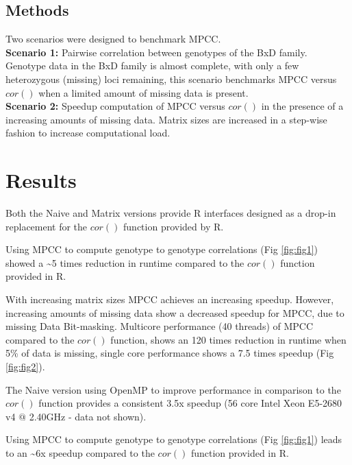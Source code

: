 \documentclass{bioinfo}
\begin{document}
\vspace*{-5mm}

\begin{methods}

\section{Methods}
Two scenarios were designed to benchmark MPCC.\\ {\bf Scenario 1:}
Pairwise correlation between genotypes of the BxD family.  Genotype
data in the BxD family is almost complete, with only a few
heterozygous (missing) loci remaining, this scenario benchmarks MPCC
versus $cor()$ when a limited amount of missing data is present.\\
{\bf Scenario 2:} Speedup computation of MPCC versus $cor()$ in the
presence of a increasing amounts of missing data. Matrix sizes are
increased in a step-wise fashion to increase computational load.
\end{methods}

\vspace*{-2mm}

\section{Results}

Both the Naive and Matrix versions provide R interfaces designed as a
drop-in replacement for the $cor()$ function provided by R.

Using MPCC to compute genotype to genotype correlations
(Fig \ref{fig:fig1}) showed a \textasciitilde{}5 times reduction in
runtime compared to the $cor()$ function provided in R.

With increasing matrix sizes MPCC achieves an increasing
speedup. However, increasing amounts of missing data show a decreased
speedup for MPCC, due to missing Data Bit-masking. Multicore
performance (40 threads) of MPCC compared to the $cor()$ function,
shows an 120 times reduction in runtime when 5\% of data is missing,
single core performance shows a 7.5 times speedup
(Fig \ref{fig:fig2}).

The Naive version using OpenMP to improve performance in comparison to
the $cor()$ function provides a consistent 3.5x speedup (56 core Intel
Xeon E5-2680 v4 $@$ 2.40GHz - data not shown).

Using MPCC to compute genotype to genotype correlations
(Fig \ref{fig:fig1}) leads to an \textasciitilde{}6x speedup compared
to the $cor()$ function provided in R.
\end{document}
